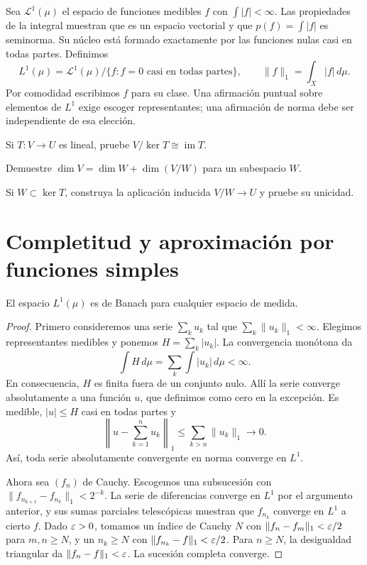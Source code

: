 Sea $\mathscr L^1(\mu)$ el espacio de funciones medibles $f$ con $\int|f|<\infty$. Las propiedades de la integral muestran que es un espacio vectorial y que $p(f)=\int|f|$ es seminorma. Su núcleo está formado exactamente por las funciones nulas casi en todas partes. Definimos
\[L^1(\mu)=\mathscr L^1(\mu)/\{f:f=0\text{ casi en todas partes}\},\qquad
\|f\|_1=\int_X|f|\,d\mu.
\]
Por comodidad escribimos $f$ para su clase. Una afirmación puntual sobre elementos de $L^1$ exige escoger representantes; una afirmación de norma debe ser independiente de esa elección.

\begin{ejercicio}\label{ej:v2-l13-1}
Si $T:V\to U$ es lineal, pruebe $V/\ker T\cong\operatorname{im}T$.
\end{ejercicio}

\begin{ejercicio}\label{ej:v2-l13-2}
Demuestre $\dim V=\dim W+\dim(V/W)$ para un subespacio $W$.
\end{ejercicio}

\begin{ejercicio}\label{ej:v2-l13-3}
Si $W\subset\ker T$, construya la aplicación inducida $V/W\to U$ y pruebe su unicidad.
\end{ejercicio}


\section{Completitud y aproximación por funciones simples}\label{lectura:v2-16}
\begin{teorema}\label{teo:v2-L1-Banach}
El espacio $L^1(\mu)$ es de Banach para cualquier espacio de medida.
\end{teorema}
\begin{proof}
Primero consideremos una serie $\sum_ku_k$ tal que $\sum_k\|u_k\|_1<\infty$. Elegimos representantes medibles y ponemos $H=\sum_k|u_k|$. La convergencia monótona da
\[\int H\,d\mu=\sum_k\int|u_k|\,d\mu<\infty.
\]
En consecuencia, $H$ es finita fuera de un conjunto nulo. Allí la serie converge absolutamente a una función $u$, que definimos como cero en la excepción. Es medible, $|u|\le H$ casi en todas partes y
\[\left\|u-\sum_{k=1}^nu_k\right\|_1\le\sum_{k>n}\|u_k\|_1\longrightarrow0.
\]
Así, toda serie absolutamente convergente en norma converge en $L^1$.

Ahora sea $(f_n)$ de Cauchy. Escogemos una subsucesión con $\|f_{n_{k+1}}-f_{n_k}\|_1<2^{-k}$. La serie de diferencias converge en $L^1$ por el argumento anterior, y sus sumas parciales telescópicas muestran que $f_{n_k}$ converge en $L^1$ a cierto $f$. Dado $\varepsilon>0$, tomamos un índice de Cauchy $N$ con $\|f_n-f_m\|_1<\varepsilon/2$ para $m,n\ge N$, y un $n_k\ge N$ con $\|f_{n_k}-f\|_1<\varepsilon/2$. Para $n\ge N$, la desigualdad triangular da $\|f_n-f\|_1<\varepsilon$. La sucesión completa converge.
\end{proof}

